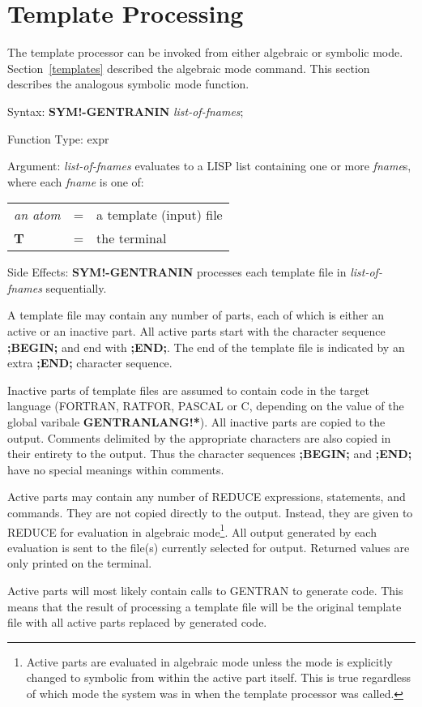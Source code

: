\section{Template Processing}
The template processor can be invoked from either algebraic or
symbolic mode.  Section~\ref{templates}
described the algebraic mode command.  This
section describes the analogous symbolic mode function.
\begin{describe}{Syntax:}
{\bf SYM!-GENTRANIN} {\it list-of-fnames\/};
\end{describe} 
\begin{describe}{Function Type:}
expr
\end{describe} 
\begin{describe}{Argument:}
{\it list-of-fnames\/} evaluates to a LISP list containing one or more
{\it fname\/}s, where each {\it fname\/} is one of:

\begin{tabular}{lll}
{\it an atom} & = & a template (input) file\\
{\bf T} & = & the terminal\\
\end{tabular}
\end{describe} 
\begin{describe}{Side Effects:}
{\bf SYM!-GENTRANIN} processes each template file in {\it list-of-fnames\/}
sequentially.

A template file may contain any number of parts, each of which
is either an active or an inactive part.  All active parts start with
the character sequence {\bf ;BEGIN;} and end with {\bf ;END;}.  The end
of the template file is indicated by an extra {\bf ;END;} character sequence.

Inactive parts of template files are assumed to contain code in
the target language (FORTRAN, RATFOR, PASCAL or C, depending on
the value of the global varibale {\bf GENTRANLANG!*}).  All
inactive parts are copied to the output.  Comments delimited
by the appropriate characters are also copied in their entirety
to the output.  Thus the character sequences {\bf ;BEGIN;} and {\bf ;END;}
have no special meanings within comments.

Active parts may contain any number of REDUCE expressions,
statements, and commands.  They are not copied directly to
the output.  Instead, they are given to REDUCE for evaluation in
algebraic mode\footnote{
Active parts are evaluated in algebraic mode unless the mode is
explicitly changed to symbolic from within the active part
itself.  This is true regardless of which mode the system
was in when the template processor was called.}.  All
output generated by each evaluation is sent to the file(s) currently
selected for output.  Returned values are only printed on the terminal.

Active parts will most likely contain calls to GENTRAN to generate code.  This
means that the result of processing a template file will be the original
template file with all active parts replaced by generated code.
\end{describe} 

